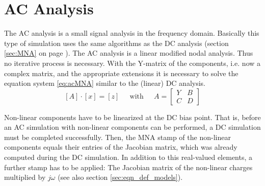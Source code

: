 %
%
%
%

\chapter{AC Analysis}
\label{sec:acMNA}

The AC analysis is a small signal analysis in the frequency domain.
Basically this type of simulation uses the same algorithms as the DC
analysis (section \ref{sec:MNA} on page \pageref{sec:MNA}).  The AC
analysis is a linear modified nodal analysis.  Thus no iterative
process is necessary.  With the Y-matrix of the components, i.e. now a
complex matrix, and the appropriate extensions it is necessary to
solve the equation system \eqref{eq:acMNA} similar to the (linear) DC
analysis.
\begin{equation}
\label{eq:acMNA}
\left[A\right] \cdot \left[x\right] = \left[z\right]
\;\;\;\; \textrm{ with } \;\;\;\;
A =
\begin{bmatrix}
Y & B\\
C & D
\end{bmatrix}
\end{equation}

Non-linear components have to be linearized at the DC bias point.
That is, before an AC simulation with non-linear components can
be performed, a DC simulation must be completed successfully.
Then, the MNA stamp of the non-linear components equals their
entries of the Jacobian matrix, which was already computed
during the DC simulation. In addition to this real-valued elements,
a further stamp has to be applied: The Jacobian matrix of the
non-linear charges multiplied by $j\omega$ (see also section
\ref{sec:eqn_def_models}).
